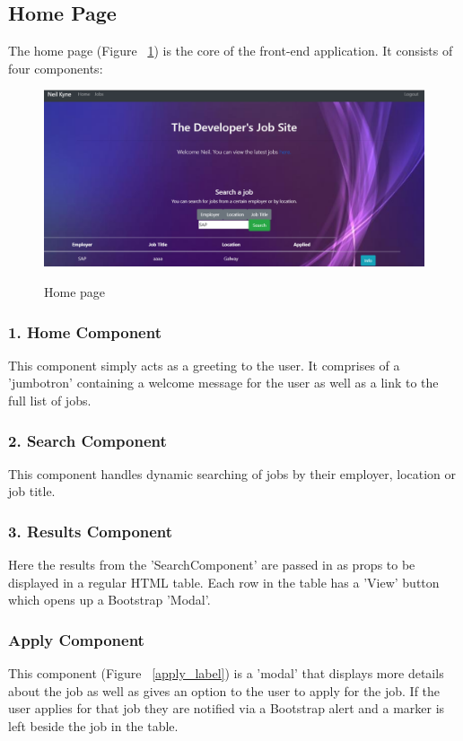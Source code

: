\subsection{Home Page}
The home page (Figure ~\ref{home_label}) is the core of the front-end application. It consists of four components:

\begin{figure}[ht]
    \centering
    \includegraphics[scale=0.3]{Images/home.png} 
    \label{home_label}
    \caption{Home page}
\end{figure}

\subsubsection{1. Home Component}
This component simply acts as a greeting to the user. It comprises of a 'jumbotron' containing a welcome message for the user as well as a link to the full list of jobs.

\subsubsection{2. Search Component}
This component handles dynamic searching of jobs by their employer, location or job title.

\subsubsection{3. Results Component}
Here the results from the 'SearchComponent' are passed in as props to be displayed in a regular HTML table. Each row in the table has a 'View' button which opens up a Bootstrap 'Modal'.

\subsubsection{Apply Component}
This component (Figure ~\ref{apply_label}) is a 'modal' that displays more details about the job as well as gives an option to the user to apply for the job. If the user applies for that job they are notified via a Bootstrap alert and a marker is left beside the job in the table.

